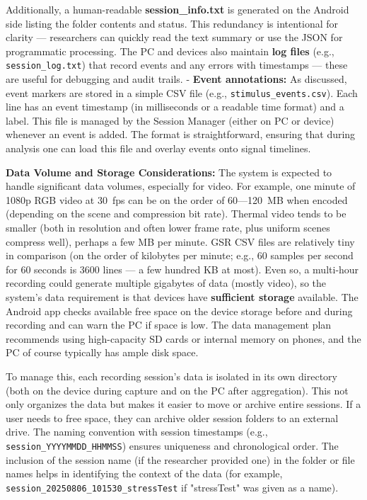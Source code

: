 Additionally, a human-readable \textbf{session_info.txt} is generated on the
Android side listing the folder contents and
status\cite{SessionManagerKt}\cite{Fowles1981}.
This redundancy is intentional for clarity --- researchers can quickly
read the text summary or use the JSON for programmatic processing. The
PC and devices also maintain \textbf{log files} (e.g., \texttt{session\_log.txt})
that record events and any errors with timestamps --- these are useful
for debugging and audit trails. - \textbf{Event annotations:} As discussed,
event markers are stored in a simple CSV file (e.g.,
\texttt{stimulus\_events.csv}). Each line has an event timestamp (in
milliseconds or a readable time format) and a label. This file is
managed by the Session Manager (either on PC or device) whenever an
event is
added\cite{ContactlessStressThermal2022}.
The format is straightforward, ensuring that during analysis one can
load this file and overlay events onto signal timelines.

\textbf{Data Volume and Storage Considerations:} The system is expected to
handle significant data volumes, especially for video. For example, one
minute of 1080p RGB video at 30 fps can be on the order of 60---120 MB
when encoded (depending on the scene and compression bit rate). Thermal
video tends to be smaller (both in resolution and often lower frame
rate, plus uniform scenes compress well), perhaps a few MB per minute.
GSR CSV files are relatively tiny in comparison (on the order of
kilobytes per minute; e.g., 60 samples per second for 60 seconds is 3600
lines --- a few hundred KB at most). Even so, a multi-hour recording
could generate multiple gigabytes of data (mostly video), so the
system's data requirement is that devices have \textbf{sufficient storage}
available. The Android app checks available free space on the device
storage before and during
recording\cite{SessionManagerKt}
and can warn the PC if space is low. The data management plan recommends
using high-capacity SD cards or internal memory on phones, and the PC of
course typically has ample disk space.

To manage this, each recording session's data is isolated in its own
directory (both on the device during capture and on the PC after
aggregation). This not only organizes the data but makes it easier to
move or archive entire sessions. If a user needs to free space, they can
archive older session folders to an external drive. The naming
convention with session timestamps (e.g., \texttt{session_YYYYMMDD_HHMMSS})
ensures uniqueness and chronological order. The inclusion of the session
name (if the researcher provided one) in the folder or file names helps
in identifying the context of the data (for example,
\texttt{session_20250806_101530_stressTest} if "stressTest" was given as a
name).


